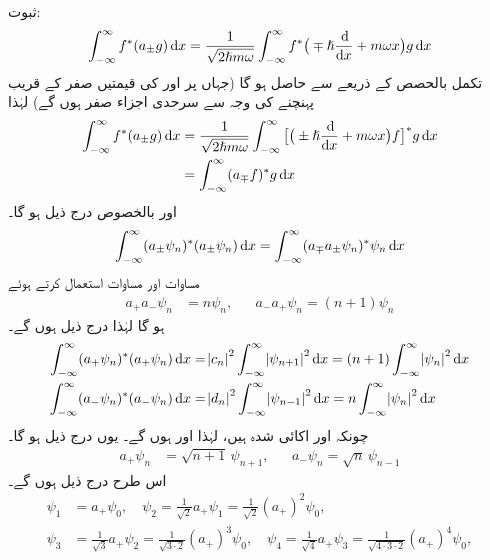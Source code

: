 ثبوت:
\begin{align*}
\int_{ - \infty}^{ \infty} f^*( a_{\pm}g ) \dif x = \frac{1}{ \sqrt{ 2 \hslash m \omega}} \int_{ - \infty}^{ \infty} f^*\big( \mp \hslash \frac{\dif}{\dif x} + m \omega x \big) g \dif x
\end{align*} 
تکمل بالحصص کے ذریعے 
 سے  حاصل ہو گا (جہاں  پر  اور  کی قیمتیں صفر  کے قریب پہنچنے کی وجہ سے سرحدی اجزاء صفر ہوں گے) لہٰذا 
\begin{align*}
\int_{ - \infty}^{ \infty} f^*( a_{\pm} g) \dif x &= \frac{1}{ \sqrt{ 2 \hslash m \omega}} \int_{ - \infty}^{ \infty} \big[ \big( \pm \hslash \frac{\dif}{\dif x} + m \omega x \big) f\big]^* g \dif x \\
&= \int_{ - \infty}^{ \infty} (a_\mp f )^* g \dif x
\end{align*} 
اور بالخصوص درج ذیل ہو گا۔
\begin{align*}
\int_{ - \infty}^{ \infty} ( a_\pm \psi_n )^*( a_\pm \psi_n ) \dif x = \int_{ - \infty}^{ \infty} ( a_\mp a_\pm \psi_n )^* \psi_n \dif x
\end{align*}
 مساوات  اور مساوات  استعمال کرتے ہوئے 
\begin{align}\label{مساوات_شروڈنگر_سیڑھی_رفعت_تقلیل}
a_+ a_- \psi_n &= n \psi_n , && a_- a_+ \psi_n = ( n+1 ) \psi_n 
\end{align}
ہو گا لہٰذا درج ذیل ہوں گے۔ 
\begin{align*}
\int_{ - \infty}^{ \infty} ( a_+ \psi_n )^*( a_+ \psi_n ) \dif x &= \abs{c_n}^2 \int_{ - \infty}^{ \infty} \abs{ \psi_{n+1}}^2 \dif x = ( n+1 ) \int_{ - \infty}^{ \infty} \abs{ \psi_n}^2 \dif x
\\
\int_{ - \infty}^{ \infty} ( a_- \psi_n )^*( a_- \psi_n ) \dif x &= \abs{ d_n}^2 \int_{ - \infty}^{ \infty} \abs{ \psi_{n-1}}^2 \dif x = n \int_{ - \infty}^{ \infty} \abs{ \psi_n}^2 \dif x
\end{align*}
چونکہ  اور  اکائی شدہ ہیں، لہٰذا  اور
 ہوں گے۔ یوں درج ذیل ہو گا۔
\begin{align}
a_+ \psi_n &= \sqrt{n+1} \,\psi_{n+1} ,&& a_- \psi_n = \sqrt{n} \,\psi_{n-1}
\end{align}
اس طرح درج ذیل ہوں گے۔
\begin{align*}
\psi_1 &= a_+ \psi_0 , \quad \psi_2 =\frac{1}{\sqrt{2}} a_+ \psi_1 = \frac{1}{ \sqrt{ 2}} (a_+)^2 \psi_0,
\\
\psi_3 &= \frac{ 1}{ \sqrt{ 3}} a_+ \psi_2 = \frac{ 1}{ \sqrt{3 \cdot 2}} ( a_+ )^3 \psi_0 ,\quad \psi_4 = \frac{1}{ \sqrt{4}} a_+ \psi_3 =\frac{1}{ \sqrt{4 \cdot 3 \cdot 2}} ( a_+)^4 \psi_0,
\end{align*}
